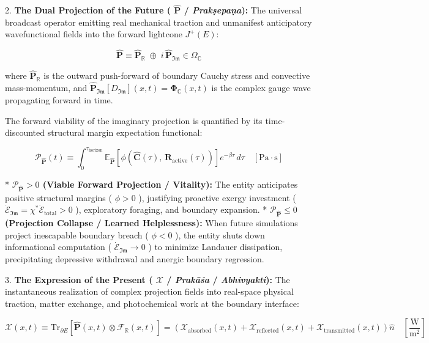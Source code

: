 \documentclass[11pt,a4paper]{article}
\theoremstyle{definition}
\theoremstyle{remark}
\begin{document}
2. \textbf{The Dual Projection of the Future ( $\hat{\mathbf{P}}$ / \textit{Prakṣepaṇa}):}
The universal broadcast operator emitting real mechanical traction and unmanifest anticipatory wavefunctional fields into the forward lightcone $J^+(E)$:


\begin{equation}
\boxed{\hat{\mathbf{P}} \equiv \hat{\mathbf{P}}_{\mathbb{R}} \;\oplus\; i \, \hat{\mathbf{P}}_{\mathfrak{Im}} \in \Omega_{\mathbb{C}}}
\end{equation}


where $\hat{\mathbf{P}}_{\mathbb{R}}$ is the outward push-forward of boundary Cauchy stress and convective mass-momentum, and $\hat{\mathbf{P}}_{\mathfrak{Im}}[D_{\mathfrak{Im}}](x, t) = \mathbf{\Phi}_{\mathbb{C}}(x, t)$ is the complex gauge wave propagating forward in time.

The forward viability of the imaginary projection is quantified by its time-discounted structural margin expectation functional:


\begin{equation}
\mathcal{P}_{\hat{\mathbf{P}}}(t) \equiv \int_0^{\tau_{\text{horizon}}} \mathbb{E}_{\hat{\mathbf{P}}}[ \phi\left( \hat{\mathbf{C}}(\tau), \, \mathbf{R}_{\text{active}}(\tau) \right) ] e^{-\beta \tau} \, d\tau \quad [\mathrm{Pa \cdot s}]
\end{equation}


* \textbf{$\mathcal{P}_{\hat{\mathbf{P}}} > 0$ (Viable Forward Projection / Vitality):} The entity anticipates positive structural margins ( $\phi > 0$ ), justifying proactive exergy investment ( $\dot{\mathcal{E}}_{\mathfrak{Im}} = \chi^* \dot{\mathcal{E}}_{\text{total}} > 0$ ), exploratory foraging, and boundary expansion.
* \textbf{$\mathcal{P}_{\hat{\mathbf{P}}} \le 0$ (Projection Collapse / Learned Helplessness):} When future simulations project inescapable boundary breach ( $\phi < 0$ ), the entity shuts down informational computation ( $\dot{\mathcal{E}}_{\mathfrak{Im}} \to 0$ ) to minimize Landauer dissipation, precipitating depressive withdrawal and anergic boundary regression.

3. \textbf{The Expression of the Present ( $\boldsymbol{\mathcal{X}}$ / \textit{Prakāśa} / \textit{Abhivyakti}):}
The instantaneous realization of complex projection fields into real-space physical traction, matter exchange, and photochemical work at the boundary interface:


\begin{equation}
\boxed{\boldsymbol{\mathcal{X}}(x, t) \equiv \mathrm{Tr}_{\partial E}[ \hat{\mathbf{P}}(x, t) \otimes \mathcal{F}_{\mathbb{R}}(x, t) ] = \left( \mathcal{X}_{\text{absorbed}}(x, t) + \mathcal{X}_{\text{reflected}}(x, t) + \mathcal{X}_{\text{transmitted}}(x, t) \right) \hat{n} \quad [\frac{\mathrm{W}}{\mathrm{m^2}}]}
\end{equation}
\end{document}
